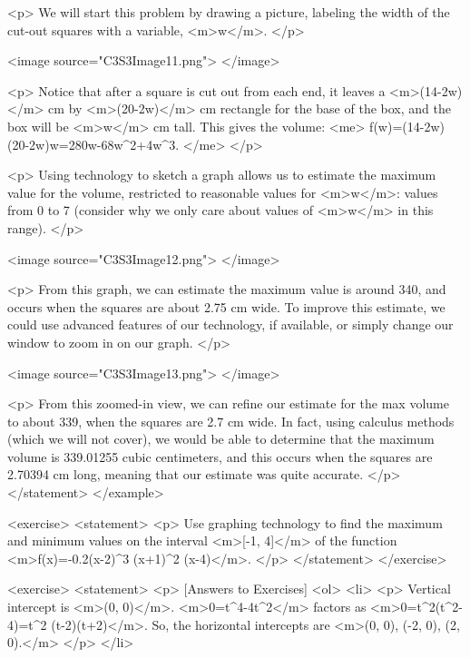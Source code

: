                 <p>
                    We will start this problem by drawing a picture, labeling the width of the cut-out squares with a variable, <m>w</m>.
                </p>

                <image source="C3S3Image11.png">
                </image>

                <p>
                    Notice that after a square is cut out from each end, it leaves a <m>(14-2w)</m> cm by <m>(20-2w)</m> cm rectangle for the base of the box, and the box will be <m>w</m> cm tall.
                    This gives the volume:
                    <me>
                        f(w)=(14-2w)(20-2w)w=280w-68w^{2}+4w^{3}.
                    </me>
                </p>

                <p>
                    Using technology to sketch a graph allows us to estimate the maximum value for the volume, restricted to reasonable values for <m>w</m>: values from 0 to 7 (consider why we only care about values of <m>w</m> in this range).
                </p>

                <image source="C3S3Image12.png">
                </image>

                <p>
                    From this graph, we can estimate the maximum value is around 340, and occurs when the squares are about 2.75 cm wide.
                    To improve this estimate, we could use advanced features of our technology, if available, or simply change our window to zoom in on our graph.
                </p>

                <image source="C3S3Image13.png">
                </image>

                <p>
                    From this zoomed-in view, we can refine our estimate for the max volume to about 339, when the squares are 2.7 cm wide.
                    In fact, using calculus methods (which we will not cover), we would be able to determine that the maximum volume is 339.01255 cubic centimeters, and this occurs when the squares are 2.70394 cm long, meaning that our estimate was quite accurate.
                </p>
            </statement>
        </example>

        <exercise>
            <statement>
                <p>
                    Use graphing technology to find the maximum and minimum values on the interval <m>[-1, 4]</m> of the function <m>f(x)=-0.2(x-2)^{3} (x+1)^{2} (x-4)</m>.
                </p>
            </statement>
        </exercise>

        <exercise>
            <statement>
                <p>
                    [Answers to Exercises]
                    <ol>
                        <li>
                            <p>
                                Vertical intercept is <m>(0, 0)</m>.
                                <m>0=t^{4}-4t^{2}</m> factors as <m>0=t^{2}(t^{2}-4)=t^{2} (t-2)(t+2)</m>.
                                So, the horizontal intercepts are <m>(0, 0), (-2, 0), (2, 0).</m>
                            </p>
                        </li>

